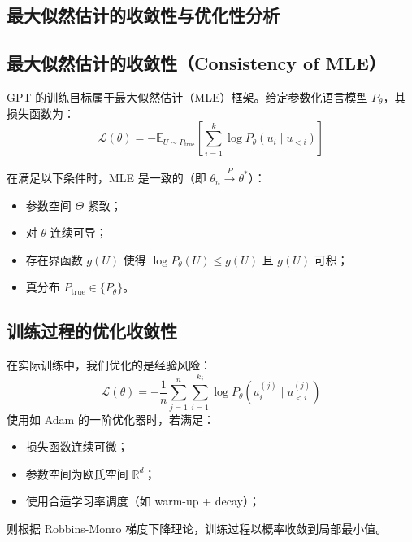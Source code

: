 \documentclass[a4paper,12pt]{article}
\begin{document}
\begin{appendices}
\section{最大似然估计的收敛性与优化性分析}
\label{appendix:mle_proof}

\subsection{最大似然估计的收敛性（Consistency of MLE）}

GPT 的训练目标属于最大似然估计（MLE）框架。给定参数化语言模型 $P_\theta$，其损失函数为：
\[
\mathcal{L}(\theta) = - \mathbb{E}_{U \sim P_{\text{true}}} \left[ \sum_{i=1}^{k} \log P_\theta(u_i \mid u_{<i}) \right]
\]

在满足以下条件时，MLE 是一致的（即 $\theta_n \xrightarrow{P} \theta^*$）：
\begin{itemize}
    \item 参数空间 $\Theta$ 紧致；
    \item 对 $\theta$ 连续可导；
    \item 存在界函数 $g(U)$ 使得 $\log P_\theta(U) \leq g(U)$ 且 $g(U)$ 可积；
    \item 真分布 $P_{\text{true}} \in \{P_\theta\}$。
\end{itemize}

\subsection{训练过程的优化收敛性}

在实际训练中，我们优化的是经验风险：
\[
\hat{\mathcal{L}}(\theta) = - \frac{1}{n} \sum_{j=1}^{n} \sum_{i=1}^{k_j} \log P_\theta(u_i^{(j)} \mid u_{<i}^{(j)})
\]
使用如 Adam 的一阶优化器时，若满足：
\begin{itemize}
    \item 损失函数连续可微；
    \item 参数空间为欧氏空间 $\mathbb{R}^d$；
    \item 使用合适学习率调度（如 warm-up + decay）；
\end{itemize}
则根据 Robbins-Monro 梯度下降理论，训练过程以概率收敛到局部最小值。
\end{appendices}
\end{document}
